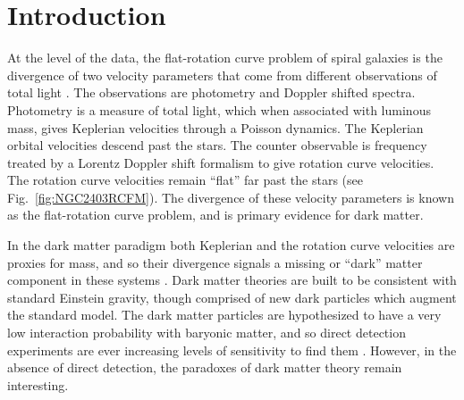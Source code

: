 \documentclass[reprint,%
 amsmath,amssymb,
 aps,
]{revtex4-1}
\begin{document}
\section{Introduction  \label{sec:uno}}



  At the level of the data, the flat-rotation curve problem of spiral galaxies is  the divergence of two velocity parameters that come  from  different    observations of total light
 \cite{Rub,Bosma,1985ApJAlbada}. 
 The  observations   are photometry and Doppler shifted spectra. 
 Photometry is a measure of total light, which when associated with luminous mass, 
 gives Keplerian velocities through a
Poisson  dynamics.  
The Keplerian orbital  velocities   descend  past   the stars. 
The counter observable is frequency treated by a Lorentz  Doppler shift formalism to give   rotation curve velocities. 
The rotation curve velocities remain ``flat''  far past the stars (see Fig.~\ref{fig:NGC2403RCFM}). The divergence of these velocity parameters is   known as the 
  flat-rotation curve problem, and  is
 primary evidence for dark matter.

 
In the dark matter paradigm   both   Keplerian  and the rotation curve velocities are  proxies for mass,  and so their divergence signals a   missing or ``dark'' matter component in these systems . 
Dark matter theories are built to be consistent with standard Einstein gravity, though      comprised of new dark particles  which augment the standard model. The  dark matter  particles are hypothesized to    have a very low interaction probability with baryonic matter, and so   direct detection experiments are ever increasing levels of sensitivity  to find them \cite{Cebrian:2022brv}. However, in the absence of  direct detection,   the paradoxes of dark matter theory remain    interesting.   
 
 
\end{document}
